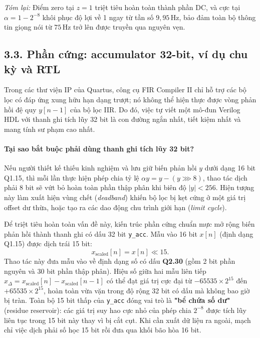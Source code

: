 \textit{Tóm lại:} Điểm zero tại $z = 1$ triệt tiêu hoàn toàn thành phần DC, và cực tại $\alpha = 1 - 2^{-8}$ khôi phục độ lợi về 1 ngay từ tần số $9{,}95\,\text{Hz}$, bảo đảm toàn bộ thông tin giọng nói từ $75\,\text{Hz}$ trở lên được truyền qua nguyên vẹn.

\subsection*{3.3. Phần cứng: accumulator 32-bit, ví dụ chu kỳ và RTL}

Trong các thư viện IP của Quartus, công cụ FIR Compiler II chỉ hỗ trợ các bộ lọc có đáp ứng xung hữu hạn dạng trượt; nó không thể hiện thực được vòng phản hồi đệ quy $y[n-1]$ của bộ lọc IIR. Do đó, việc tự viết một mô-đun Verilog HDL với thanh ghi tích lũy 32 bit là con đường ngắn nhất, tiết kiệm nhất và mang tính sư phạm cao nhất.

\paragraph{Tại sao bắt buộc phải dùng thanh ghi tích lũy 32 bit?}
Nếu người thiết kế thiếu kinh nghiệm và lưu giữ biến phản hồi $y$ dưới dạng 16 bit Q1.15, thì mỗi lần thực hiện phép chia tỷ lệ $\alpha y = y - (y \ggg 8)$, thao tác dịch phải 8 bit sẽ vứt bỏ hoàn toàn phần thập phân khi biên độ $|y| < 256$. Hiện tượng này làm xuất hiện vùng chết (\emph{deadband}) khiến bộ lọc bị kẹt cứng ở một giá trị offset dư thừa, hoặc tạo ra các dao động chu trình giới hạn (\emph{limit cycle}).

Để triệt tiêu hoàn toàn vấn đề này, kiến trúc phần cứng chuẩn mực mở rộng biến phản hồi thành thanh ghi có dấu 32 bit \texttt{y\_acc}. Mẫu vào 16 bit $x[n]$ (định dạng Q1.15) được dịch trái 15 bit:
\begin{equation}
x_{\mathrm{scaled}}[n] = x[n] \ll 15.
\end{equation}
Thao tác này đưa mẫu vào về định dạng số có dấu \textbf{Q2.30} (gồm 2 bit phần nguyên và 30 bit phần thập phân). Hiệu số giữa hai mẫu liên tiếp $x_{\Delta} = x_{\mathrm{scaled}}[n] - x_{\mathrm{scaled}}[n-1]$ có thể đạt giá trị cực đại từ $-65535 \times 2^{15}$ đến $+65535 \times 2^{15}$, hoàn toàn vừa vặn trong độ rộng 32 bit có dấu mà không bao giờ bị tràn. Toàn bộ 15 bit thấp của \texttt{y\_acc} đóng vai trò là \textbf{"bể chứa số dư"} (residue reservoir): các giá trị suy hao cực nhỏ của phép chia $2^{-8}$ được tích lũy liên tục trong 15 bit này thay vì bị cắt cụt. Khi cần xuất dữ liệu ra ngoài, mạch chỉ việc dịch phải số học 15 bit rồi đưa qua khối bão hòa 16 bit.

